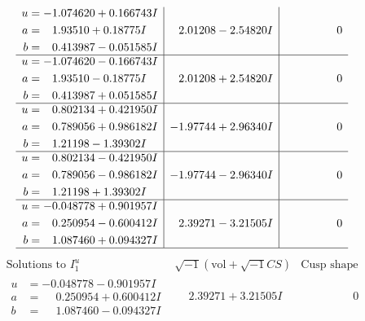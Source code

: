 \documentclass[1p]{elsarticle_modified}
\theoremstyle{definition}
\newcommand{\I}{\sqrt{-1}}
\begin{document}
$$\begin{array}{c|c|c}
\begin{aligned}
u &= -1.074620 + 0.166743 I \\
a &= \phantom{-}1.93510 + 0.18775 I \\
b &= \phantom{-}0.413987 - 0.051585 I\end{aligned}
 & \phantom{-}2.01208 - 2.54820 I & \phantom{-0.000000 } 0 \\ \hline\begin{aligned}
u &= -1.074620 - 0.166743 I \\
a &= \phantom{-}1.93510 - 0.18775 I \\
b &= \phantom{-}0.413987 + 0.051585 I\end{aligned}
 & \phantom{-}2.01208 + 2.54820 I & \phantom{-0.000000 } 0 \\ \hline\begin{aligned}
u &= \phantom{-}0.802134 + 0.421950 I \\
a &= \phantom{-}0.789056 + 0.986182 I \\
b &= \phantom{-}1.21198 - 1.39302 I\end{aligned}
 & -1.97744 + 2.96340 I & \phantom{-0.000000 } 0 \\ \hline\begin{aligned}
u &= \phantom{-}0.802134 - 0.421950 I \\
a &= \phantom{-}0.789056 - 0.986182 I \\
b &= \phantom{-}1.21198 + 1.39302 I\end{aligned}
 & -1.97744 - 2.96340 I & \phantom{-0.000000 } 0 \\ \hline\begin{aligned}
u &= -0.048778 + 0.901957 I \\
a &= \phantom{-}0.250954 - 0.600412 I \\
b &= \phantom{-}1.087460 + 0.094327 I\end{aligned}
 & \phantom{-}2.39271 - 3.21505 I & \phantom{-0.000000 } 0\\
 \hline 
 \end{array}$$\newpage$$\begin{array}{c|c|c}  
\text{Solutions to }I^u_{1}& \I (\text{vol} + \sqrt{-1}CS) & \text{Cusp shape}\\
 \hline 
\begin{aligned}
u &= -0.048778 - 0.901957 I \\
a &= \phantom{-}0.250954 + 0.600412 I \\
b &= \phantom{-}1.087460 - 0.094327 I\end{aligned}
 & \phantom{-}2.39271 + 3.21505 I & \phantom{-0.000000 } 0 \\ \hline\begin{aligned}

\end{aligned}
\end{array}$$
\end{document}
